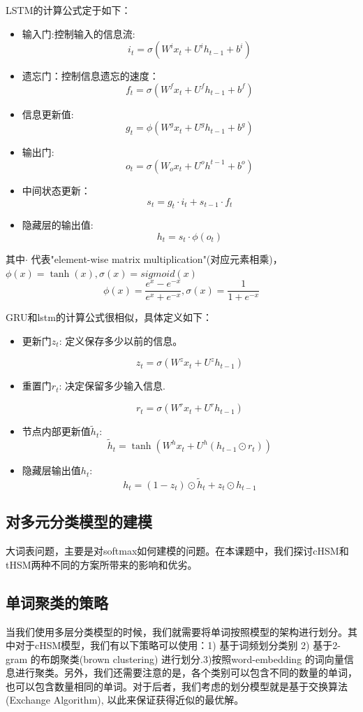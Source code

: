 \documentclass[12pt,a4paper]{article}
\begin{document}
LSTM的计算公式定于如下：
\begin{itemize}
\item 输入门:控制输入的信息流:
$$i_t=\sigma(W^i x_t+U^i h_{t-1}+b^i)$$
\item  遗忘门：控制信息遗忘的速度：
$$f_t=\sigma(W^f x_t+U^f h_{t-1}+b^f)$$
\item  信息更新值:
$$g_t=\phi(W^g x_t+U^g h_{t-1}+b^g)$$
\item  输出门:
$$o_t=\sigma(W_o x_t+U^o h^{t-1}+b^o)$$
\item  中间状态更新：
$$s_t=g_t\cdot i_t+s_{t-1}\cdot f_t$$
\item  隐藏层的输出值:
$$h_t=s_t\cdot \phi(o_t)$$
\end{itemize}
其中$\cdot$ 代表"element-wise matrix multiplication"(对应元素相乘)，$\phi(x)=\tanh(x),\sigma(x)=sigmoid(x)$
$$\phi(x)=\frac{e^x-e^{-x}}{e^x+e^{-x}},\sigma(x)=\frac{1}{1+e^{-x}}$$

GRU和lstm的计算公式很相似，具体定义如下：
\begin{itemize}
\item 更新门$z_t$: 定义保存多少以前的信息。

\[z_t = \sigma ( W^z x_t+ U^z h_{t-1}  )\]

\item 重置门$r_t$: 决定保留多少输入信息.

\[r_t = \sigma(W^r x_t  + U^r h_{t-1}  )\]

\item 节点内部更新值$\tilde h_t $:
 \[\tilde h_t  = \tanh (W^h x_t  + U^h(h_{t-1} \odot r_t) )\]

\item 隐藏层输出值$h_t$: 
\[h_t = (1-z_t)\odot \tilde h_t  + z_t \odot h_{t-1}\]
\end{itemize}

\subsection{对多元分类模型的建模}
大词表问题，主要是对softmax如何建模的问题。在本课题中，我们探讨cHSM和tHSM两种不同的方案所带来的影响和优劣。
\subsection{单词聚类的策略}
当我们使用多层分类模型的时候，我们就需要将单词按照模型的架构进行划分。其中对于cHSM模型，我们有以下策略可以使用：1) 基于词频划分类别 2) 基于2-gram 的布朗聚类(brown clustering) 进行划分.3)按照word-embedding 的词向量信息进行聚类。另外，我们还需要注意的是，各个类别可以包含不同的数量的单词，也可以包含数量相同的单词。对于后者，我们考虑的划分模型就是基于交换算法(Exchange Algorithm), 以此来保证获得近似的最优解。
\end{document}
